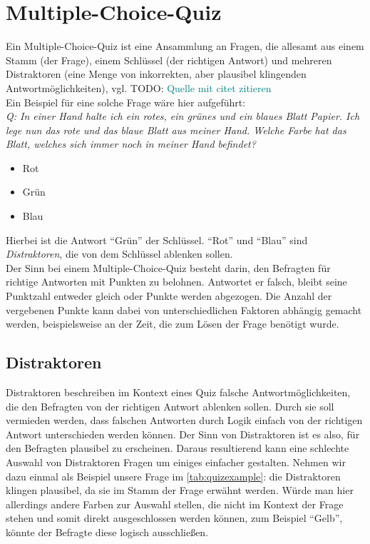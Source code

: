 \documentclass[headsepline,titlepage,ngerman,twoside,12pt]{report}
\newcommand\todo[1]{TODO: \textcolor{teal}{#1}}
\begin{document}
\section{Multiple-Choice-Quiz}
\label{sec:quiz}
Ein Multiple-Choice-Quiz ist eine Ansammlung an Fragen, die allesamt aus einem Stamm (der Frage), einem Schlüssel (der richtigen Antwort) und mehreren Distraktoren (eine Menge von inkorrekten, aber plausibel klingenden Antwortmöglichkeiten), vgl. \todo{Quelle mit citet zitieren}
\\Ein Beispiel für eine solche Frage wäre hier aufgeführt:
\\\textit{Q: In einer Hand halte ich ein rotes, ein grünes und ein blaues Blatt Papier. Ich lege nun das rote und das blaue Blatt aus meiner Hand. Welche Farbe hat das Blatt, welches sich immer noch in meiner Hand befindet?}
\label{tab:quizexample}
\begin{itemize}
    \item Rot
    \item Grün
    \item Blau
\end{itemize}
Hierbei ist die Antwort \enquote{Grün} der Schlüssel. \enquote{Rot} und \enquote{Blau} sind \textit{Distraktoren}, die von dem Schlüssel ablenken sollen.
\\Der Sinn bei einem Multiple-Choice-Quiz besteht darin, den Befragten für richtige Antworten mit Punkten zu belohnen. Antwortet er falsch, bleibt seine Punktzahl entweder gleich oder Punkte werden abgezogen. Die Anzahl der vergebenen Punkte kann dabei von unterschiedlichen Faktoren abhängig gemacht werden, beispielsweise an der Zeit, die zum Lösen der Frage benötigt wurde.
\subsection{Distraktoren}
\label{sub:distraktoren}
Distraktoren beschreiben im Kontext eines Quiz falsche Antwortmöglichkeiten, die den Befragten von der richtigen Antwort ablenken sollen.
Durch sie soll vermieden werden, dass falschen Antworten durch Logik einfach von der richtigen Antwort unterschieden werden können. Der Sinn von Distraktoren ist es also, für den Befragten plausibel zu erscheinen.
Daraus resultierend kann eine schlechte Auswahl von Distraktoren Fragen um einiges einfacher gestalten. Nehmen wir dazu einmal als Beispiel unsere Frage im \cref{tab:quizexample}:
die Distraktoren klingen plausibel, da sie im Stamm der Frage erwähnt werden. Würde man hier allerdings andere Farben zur Auswahl stellen, die nicht im Kontext der Frage stehen und somit direkt ausgeschlossen werden können, zum Beispiel \enquote{Gelb}, könnte der Befragte diese logisch ausschließen. 
\end{document}

